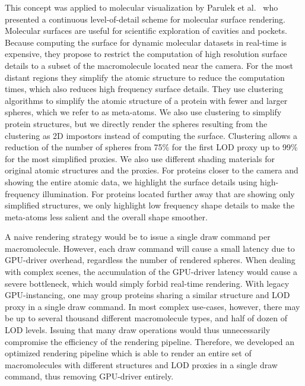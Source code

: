 This concept was applied to molecular visualization by Parulek et al.~\cite{parulek2014continuous} who presented a continuous level-of-detail scheme for molecular surface rendering.
Molecular surfaces are useful for scientific exploration of cavities and pockets.
Because computing the surface for dynamic molecular datasets in real-time is expensive, they propose to restrict the computation of high resolution surface details to a subset of the macromolecule located near the camera.
For the most distant regions they simplify the atomic structure to reduce the computation times, which also reduces high frequency surface details.
They use clustering algorithms to simplify the atomic structure of a protein with fewer and larger spheres, which we refer to as meta-atoms.
We also use clustering to simplify protein structures, but we directly render the spheres resulting from the clustering as 2D impostors instead of computing the surface.
Clustering allows a reduction of the number of spheres from 75\% for the first LOD proxy up to 99\% for the most simplified proxies.
We also use different shading materials for original atomic structures and the proxies.
For proteins closer to the camera and showing the entire atomic data, we highlight the surface details using high-frequency illumination.
For proteins located further away that are showing only simplified structures, we only highlight low frequency shape details to make the meta-atoms less salient and the overall shape smoother.

A naive rendering strategy would be to issue a single draw command per macromolecule.
However, each draw command will cause a small latency due to GPU-driver overhead, regardless the number of rendered spheres.
When dealing with complex scenes, the accumulation of the GPU-driver latency would cause a severe bottleneck, which would simply forbid real-time rendering.
With legacy GPU-instancing, one may group proteins sharing a similar structure and LOD proxy in a single draw command.
In most complex use-cases, however, there may be up to several thousand different macromolecule types, and half of dozen of LOD levels.
Issuing that many draw operations would thus unnecessarily compromise the efficiency of the rendering pipeline.
Therefore, we developed an optimized rendering pipeline which is able to render an entire set of macromolecules with different structures and LOD proxies in a single draw command, thus removing GPU-driver entirely.

